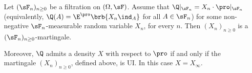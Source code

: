 \begin{lemma}\label{lem:martingale_density_ui_discrete}
Let $(\sF_n)_{n \geq 0}$ be a filtration on $(\Omega,\sF)$. %
Assume that $\Q|_{\sF_n} = X_n \cdot \pro|_{\sF_n}$ (equivalently, $\Q(A) = \E^\pro\brb{X_n \ind_A}$ for all $A\in \sF_n$) for some non-negative $\sF_n$-measurable random variable $X_n$, for every $n$. Then $(X_n)_{n \geq 0}$ is a $(\sF_n)_{n\geq 0}$-martingale.


Moreover, $\Q$ admits a density $X$ with respect to $\pro$ if and only if the martingale $(X_n)_{n \geq 0}$, defined above, is UI. In this case $X = X_\infty$.
\end{lemma}
